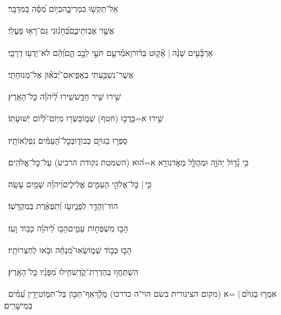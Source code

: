 \documentclass[12pt]{article}
\newcommand{\loc}[1]{\textsuperscript{\locf{#1}}}
\begin{document}
{\loc{ ח}~}‏אַל־תַּקְשׁ֣וּ  כִּמְרִיבָ֑ה{\hfill}כְּי֥וֹם מַ֝סָּ֗ה בַּמִּדְבָּֽר׃\par

{\loc{ ט}~}‏אֲשֶׁ֣ר  אֲבֽוֹתֵיכֶ֑ם{\hfill}בְּ֝חָנ֗וּנִי גַּם־רָא֥וּ פָעֳלִֽי׃\par

{\loc{ י}~}‏אַרְבָּ֘עִ֤ים שָׁנָ֨ה |  אָ֘ק֤וּט בְּד֗וֹר{\hfill}וָאֹמַ֗ר\newline\hspace*{.5em}עַ֤ם תֹּעֵ֣י לֵבָ֣ב הֵ֑ם{\hfill}וְ֝הֵ֗ם לֹא־יָדְע֥וּ דְרָכָֽי׃\par

{\loc{ יא}~}‏אֲשֶׁר־נִשְׁבַּ֥עְתִּי בְאַפִּ֑י{\hfill}אִם־יְ֝בֹא֗וּן אֶל־מְנוּחָתִֽי׃\par\pend
\ledpb
\pstart[\subsection*{\textcolor{red}{פרק צו}}]\label{פרק צו}
{\loc{ א}~}‏שִׁ֣ירוּ  שִׁ֣יר חָדָ֑שׁ{\hfill}שִׁ֥ירוּ לַ֝יהֹוָ֗ה כׇּל־הָאָֽרֶץ׃\par

{\loc{ ב}~}‏שִׁ֣ירוּ  א=בָּרֲכ֣וּ (חטף) שְׁמ֑וֹ{\hfill}בַּשְּׂר֥וּ מִיּֽוֹם־לְ֝י֗וֹם יְשׁוּעָתֽוֹ׃\par

{\loc{ ג}~}‏סַפְּר֣וּ בַגּוֹיִ֣ם כְּבוֹד֑וֹ{\hfill}בְּכׇל־הָ֝עַמִּ֗ים נִפְלְאוֹתָֽיו׃\par

{\loc{ ד}~}‏כִּ֥י גָ֘ד֤וֹל יְהֹוָ֣ה וּמְהֻלָּ֣ל מְאֹ֑ד{\hfill}נוֹרָ֥א א=ה֝וּא (השמטת נקודת הרביע) עַל־כׇּל־אֱלֹהִֽים׃\par

{\loc{ ה}~}‏כִּ֤י |  כׇּל־אֱלֹהֵ֣י הָעַמִּ֣ים אֱלִילִ֑ים{\hfill}וַ֝יהֹוָ֗ה שָׁמַ֥יִם עָשָֽׂה׃\par

{\loc{ ו}~}‏הוֹד־וְהָדָ֥ר לְפָנָ֑יו{\hfill}עֹ֥ז וְ֝תִפְאֶ֗רֶת בְּמִקְדָּשֽׁוֹ׃\par

{\loc{ ז}~}‏הָב֣וּ  מִשְׁפְּח֣וֹת עַמִּ֑ים{\hfill}הָב֥וּ לַ֝יהֹוָ֗ה כָּב֥וֹד וָעֹֽז׃\par

{\loc{ ח}~}‏הָב֣וּ  כְּב֣וֹד שְׁמ֑וֹ{\hfill}שְׂאֽוּ־מִ֝נְחָ֗ה וּבֹ֥אוּ לְחַצְרוֹתָֽיו׃\par

{\loc{ ט}~}‏הִשְׁתַּחֲו֣וּ  בְּהַדְרַת־קֹ֑דֶשׁ{\hfill}חִ֥ילוּ מִ֝פָּנָ֗יו כׇּל־הָאָֽרֶץ׃\par

{\loc{ י}~}‏אִמְר֤וּ בַגּוֹיִ֨ם |  =א (מקום הצינורית בשם הוי"ה כדרכו) מָלָ֗ךְ{\hfill}אַף־תִּכּ֣וֹן \newline\hspace*{.5em}בַּל־תִּמּ֑וֹט{\hfill}יָדִ֥ין עַ֝מִּ֗ים בְּמֵישָׁרִֽים׃\par
\end{document}
